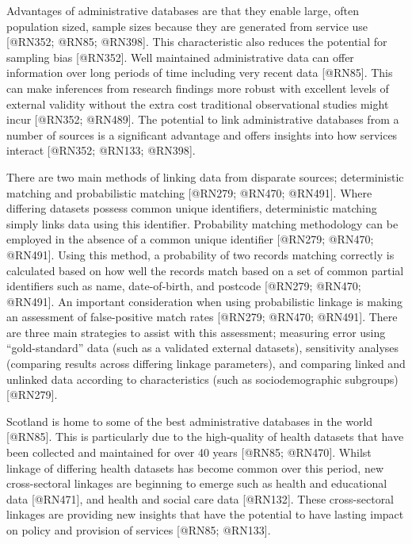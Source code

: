 \documentclass[]{article}
\begin{document}
Advantages of administrative databases are that they enable large, often
population sized, sample sizes because they are generated from service
use {[}@RN352; @RN85; @RN398{]}. This characteristic also reduces the
potential for sampling bias {[}@RN352{]}. Well maintained administrative
data can offer information over long periods of time including very
recent data {[}@RN85{]}. This can make inferences from research findings
more robust with excellent levels of external validity without the extra
cost traditional observational studies might incur {[}@RN352; @RN489{]}.
The potential to link administrative databases from a number of sources
is a significant advantage and offers insights into how services
interact {[}@RN352; @RN133; @RN398{]}.

There are two main methods of linking data from disparate sources;
deterministic matching and probabilistic matching {[}@RN279; @RN470;
@RN491{]}. Where differing datasets possess common unique identifiers,
deterministic matching simply links data using this identifier.
Probability matching methodology can be employed in the absence of a
common unique identifier {[}@RN279; @RN470; @RN491{]}. Using this
method, a probability of two records matching correctly is calculated
based on how well the records match based on a set of common partial
identifiers such as name, date-of-birth, and postcode {[}@RN279; @RN470;
@RN491{]}. An important consideration when using probabilistic linkage
is making an assessment of false-positive match rates {[}@RN279; @RN470;
@RN491{]}. There are three main strategies to assist with this
assessment; measuring error using ``gold-standard'' data (such as a
validated external datasets), sensitivity analyses (comparing results
across differing linkage parameters), and comparing linked and unlinked
data according to characteristics (such as sociodemographic subgroups)
{[}@RN279{]}.

Scotland is home to some of the best administrative databases in the
world {[}@RN85{]}. This is particularly due to the high-quality of
health datasets that have been collected and maintained for over 40
years {[}@RN85; @RN470{]}. Whilst linkage of differing health datasets
has become common over this period, new cross-sectoral linkages are
beginning to emerge such as health and educational data {[}@RN471{]},
and health and social care data {[}@RN132{]}. These cross-sectoral
linkages are providing new insights that have the potential to have
lasting impact on policy and provision of services {[}@RN85; @RN133{]}.
\end{document}
